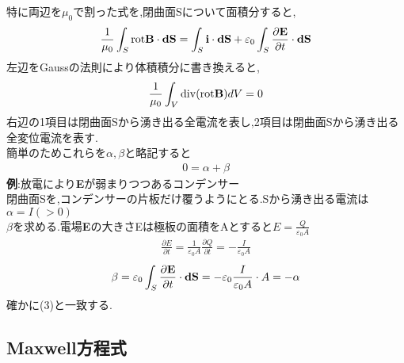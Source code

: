 \documentclass[../main]{subfiles}
\begin{document}
特に両辺を$\mu_0$で割った式を,閉曲面Sについて面積分すると,
\begin{eqnarray*}
\frac{1}{\mu_0} \int_{S} {\rm rot} {\bf B} \cdot {\bf dS} = \int_{S} {\bf i} \cdot {\bf dS} + \varepsilon_0 \int_{S} \frac{\partial {\bf E}}{\partial t} \cdot {\bf dS}
\end{eqnarray*}
左辺をGaussの法則により体積積分に書き換えると,
\begin{eqnarray*}
\frac{1}{\mu_0} \int_{V} {\rm div}({\rm rot} {\bf B}) dV = 0
\end{eqnarray*}
右辺の1項目は閉曲面Sから湧き出る全電流を表し,2項目は閉曲面Sから湧き出る全変位電流を表す. \\
簡単のためこれらを$\alpha,\beta$と略記すると
\begin{eqnarray}
0=\alpha + \beta
\end{eqnarray}
{\bf 例}:放電により{\bf E}が弱まりつつあるコンデンサー \\
閉曲面Sを,コンデンサーの片板だけ覆うようにとる.Sから湧き出る電流は$\alpha = I(>0)$ \\
$\beta$を求める.電場{\bf E}の大きさEは極板の面積をAとすると$E=\frac{Q}{\varepsilon_0 A}$ \\
\begin{eqnarray*}
\frac{\partial E}{\partial t} = \frac{1}{\varepsilon_0 A} \frac{\partial Q}{\partial t} = - \frac{I}{\varepsilon_0 A}
\end{eqnarray*}
\begin{eqnarray*}
\beta = \varepsilon_0 \int_{S} \frac{\partial {\bf E}}{\partial t} \cdot {\bf dS} = - \varepsilon_0 \frac{I}{\varepsilon_0 A} \cdot A = -\alpha
\end{eqnarray*}
確かに(3)と一致する.

\subsection{Maxwell方程式}
\end{document}
